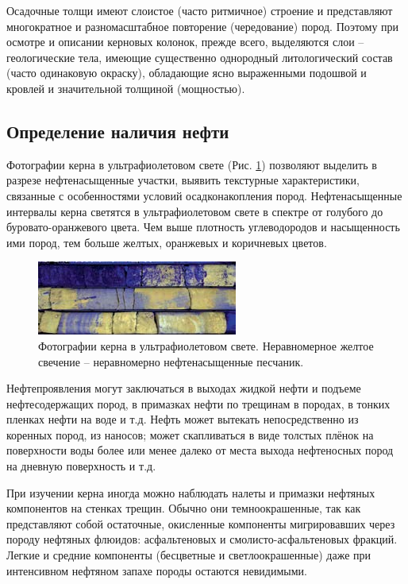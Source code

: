 \documentclass[14pt]{matmex-diploma}
\begin{document}
        Осадочные толщи имеют слоистое (часто ритмичное) строение и представляют многократное и разномасштабное повторение (чередование) пород. Поэтому при осмотре и описании керновых колонок, прежде всего, выделяются слои – геологические тела, имеющие существенно однородный литологический состав (часто одинаковую окраску), обладающие ясно выраженными подошвой и кровлей и значительной толщиной (мощностью).
        
    \subsection*{Определение наличия нефти}
    
        Фотографии керна в ультрафиолетовом свете (Рис. \ref{UV}) позволяют выделить в разрезе нефтенасыщенные участки, выявить текстурные характеристики, связанные с особенностями условий осадконакопления пород. Нефтенасыщенные интервалы керна светятся в ультрафиолетовом свете в спектре от голубого до буровато-оранжевого цвета. Чем выше плотность углеводородов и насыщенность ими пород, тем больше желтых, оранжевых и коричневых цветов. \cite{paper:kern}
        
        \begin{figure}[h]
            \centering
            \includegraphics[scale=1]{images/UV.png}
            \caption{Фотографии керна в ультрафиолетовом свете. Неравномерное желтое свечение – неравномерно нефтенасыщенные песчаник.}
            \label{UV}
        \end{figure}        
        
        Нефтепроявления могут заключаться в выходах жидкой нефти и подъеме нефтесодержащих пород, в примазках нефти по трещинам в породах, в тонких пленках нефти на воде и т.д. Нефть может вытекать непосредственно из коренных пород, из наносов; может скапливаться в виде толстых плёнок на поверхности воды более или менее далеко от места выхода нефтеносных пород на дневную поверхность и т.д.
        
        При изучении керна иногда можно наблюдать налеты и примазки нефтяных компонентов на стенках трещин. Обычно они темноокрашенные, так как представляют собой остаточные, окисленные компоненты мигрировавших через породу нефтяных флюидов: асфальтеновых и смолисто-асфальтеновых фракций. Легкие и средние компоненты (бесцветные и светлоокрашенные) даже при интенсивном нефтяном запахе породы остаются невидимыми.
        
\end{document}

